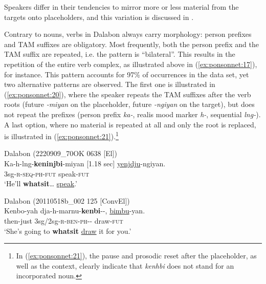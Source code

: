 \documentclass[output=paper]{langscibook}
\begin{document}
Speakers differ in their tendencies to mirror more or less material from the targets onto placeholders, and this variation is discussed in . 

Contrary to nouns, verbs in Dalabon always carry morphology: person prefixes and TAM suffixes are obligatory. Most frequently, both the person prefix and the TAM suffix are repeated, i.e. the pattern is “bilateral”. This results in the repetition of the entire verb complex, as illustrated above in (\ref{ex:ponsonnet:17}), for instance. This pattern accounts for 97\% of occurrences in the data set, yet two alternative patterns are observed. The first one is illustrated in (\ref{ex:ponsonnet:20}), where the speaker repeats the TAM suffixes after the verb roots (future \textit{{}-miyan} on the placeholder, future \textit{{}-ngiyan} on the target), but does not repeat the prefixes (person prefix \textit{ka-}, realis mood marker \textit{h-}, sequential \textit{lng-}). A last option, where no material is repeated at all and only the root is replaced, is illustrated in (\ref{ex:ponsonnet:21}).\footnote{In (\ref{ex:ponsonnet:21}), the pause and prosodic reset after the placeholder, as well as the context, clearly indicate that \textit{kenhbi} does not stand for an incorporated noun.} 

\largerpage
\ea
{\label{ex:ponsonnet:20}Dalabon (2220909\_70OK 0638 [El])}\\
\gll Ka-h-lng-\textbf{keninjbi}-miyan {[1.18 sec]}  \uline{yenjdju}-ngiyan.\\
\textup{3sg-}\textsc{r-seq-ph}\textup{-}\textsc{fut} {} \textup{speak-}\textsc{fut}\\
\glt \textup{‘He’ll} \textbf{\textup{whatsit}}\textup{… \uline{speak}.’}
\z

\ea
{\label{ex:ponsonnet:21}Dalabon (20110518b\_002 125 [ConvEl])}\\
\gll Kenbo-yah   dja-h-marnu-\textbf{kenbi}{}-{}-, \uline{bimbu}-yan.\\
\textup{then-just}     {3sg/2sg-}\textsc{r}\textup{{}-}\textsc{ben-ph}\textup{{}-{}-}   draw-\textsc{fut}\\
\glt \textup{‘She’s going to} \textbf{\textup{whatsit}} \textup{\uline{draw} it for you.’}
\z
\end{document}
